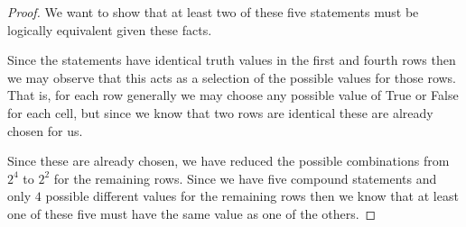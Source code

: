 \documentclass[12pt]{article}
\makeatletter
\newcommand*{\arabicodd}[1]{%
  \expandafter\@arabicodd\csname c@#1\endcsname
}
\newcommand*{\@arabicodd}[1]{%
  \@arabic{\numexpr(#1)*2-1\relax}%
}
\makeatother
\begin{document}
\begin{enumerate}[label=2.\arabicodd*, start=27]
\begin{proof}
      We want to show that at least two of these five statements must be
      logically equivalent given these facts.

      Since the statements have identical truth values in the first and fourth rows
      then we may observe that this acts as a selection of the possible values for
      those rows. That is, for each row generally we may choose any possible value
      of True or False for each cell, but since we know that two rows are identical
      these are already chosen for us.

      Since these are already chosen, we have reduced the possible combinations
      from $2^4$ to $2^2$ for the remaining rows. Since we have five compound
      statements and only $4$ possible different values for the remaining rows
      then we know that at least one of these five must have the same value
      as one of the others.
    \end{proof}
\end{enumerate}
\end{document}

